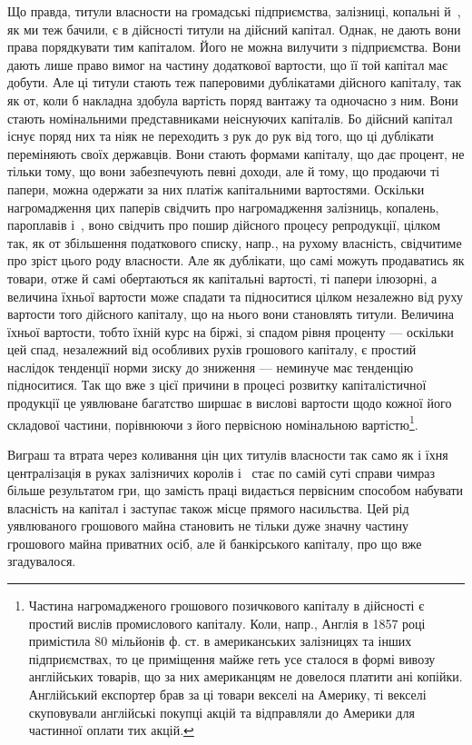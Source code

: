 
Що правда, титули власности на громадські підприємства, залізниці,
копальні й~, як ми теж бачили, є в дійсності титули на дійсний капітал.
Однак, не дають вони права порядкувати тим капіталом. Його не можна вилучити
з підприємства. Вони дають лише право вимог на частину додаткової вартости,
що її той капітал має добути. Але ці титули стають теж паперовими
дублікатами дійсного капіталу, так як от, коли б накладна здобула вартість
поряд вантажу та одночасно з ним. Вони стають номінальними представниками
неіснуючих капіталів. Бо дійсний капітал існує поряд них та ніяк не переходить
з рук до рук від того, що ці дублікати переміняють своїх державців. Вони стають
формами капіталу, що дає процент, не тільки тому, що вони забезпечують певні
доходи, але й тому, що продаючи ті папери, можна одержати за них платіж
капітальними вартостями. Оскільки нагромадження цих паперів свідчить про
нагромадження залізниць, копалень, пароплавів і~, воно свідчить про пошир
дійсного процесу репродукції, цілком так, як от збільшення податкового списку,
напр., на рухому власність, свідчитиме про зріст цього роду власности. Але як
дублікати, що самі можуть продаватись як товари, отже й самі обертаються як
капітальні вартості, ті папери ілюзорні, а величина їхньої вартости може спадати
та підноситися цілком незалежно від руху вартости того дійсного капіталу, що
на нього вони становлять титули. Величина їхньої вартости, тобто їхній курс на
біржі, зі спадом рівня проценту — оскільки цей спад, незалежний від особливих
рухів грошового капіталу, є простий наслідок тенденції норми зиску до зниження
— неминуче має тенденцію підноситися. Так що вже з цієї причини
в процесі розвитку капіталістичної продукції це уявлюване багатство ширшає
в вислові вартости щодо кожної його складової частини, порівнюючи з його первісною
номінальною вартістю\footnote{
Частина нагромадженого грошового позичкового капіталу в дійсності є простий вислів промислового
капіталу. Коли, напр., Англія в 1857 році примістила 80 мільйонів ф. ст. в американських залізницях
та інших підприємствах, то це приміщення майже геть усе сталося в формі вивозу англійських товарів,
що за них американцям не довелося платити ані копійки. Англійський експортер брав за ці товари
векселі на Америку, ті векселі скуповували англійські покупці акцій та відправляли до Америки для
частинної оплати тих акцій.
}.

Виграш та втрата через коливання цін цих титулів власности так само як
і їхня централізація в руках залізничих королів і~ стає по самій суті справи
чимраз більше результатом гри, що замість праці видається первісним способом
набувати власність на капітал і заступає також місце прямого насильства. Цей рід
уявлюваного грошового майна становить не тільки дуже значну частину грошового
майна приватних осіб, але й банкірського капіталу, про що вже згадувалося.


